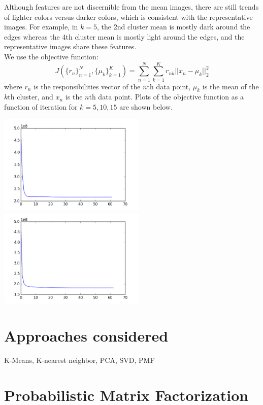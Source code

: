 \documentclass[11pt]{amsart}
\begin{document}
Although features are not discernible from the mean images, there are still trends of lighter colors versus darker colors, which is consistent with the representative images. For example, in $k=5$, the 2nd cluster mean is mostly dark around the edges whereas the 4th cluster mean is mostly light around the edges, and the representative images share these features.\\
We use the objective function:
$$J(\{r_n\}^N_{n=1},\{\mu_k\}^K_{k=1})=\sum^N_{n=1}\sum^K_{k=1}r_{nk}||x_n-\mu_k||^2_2$$
where $r_n$ is the responsibilities vector of the $n$th data point, $\mu_k$ is the mean of the $k$th cluster, and $x_n$ is the $n$th data point. Plots of the objective function as a function of iteration for $k=5,10,15$ are shown below.

\includegraphics[width=7cm]{images/k5objectives.png}
\includegraphics[width=7cm]{images/k10objectives.png}

\section{Approaches considered}
K-Means, K-nearest neighbor, PCA, SVD, PMF

\section{Probabilistic Matrix Factorization}
\end{document}
